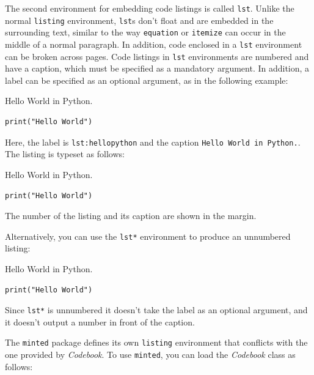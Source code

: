 \documentclass[minted]{codebook}
\begin{document}
The second environment for embedding code listings is called \verb|lst|.
Unlike the normal \verb|listing| environment, \verb|lst|s don't float and are embedded in the surrounding text, similar to the way \verb|equation| or \verb|itemize| can occur in the middle of a normal paragraph.
In addition, code enclosed in a \verb|lst| environment can be broken across pages.
Code listings in \verb|lst| environments are numbered and have a caption, which must be specified as a mandatory argument.
In addition, a label can be specified as an optional argument, as in the following example:
\begin{texcode}
\begin{lst}{Hello World in Python.}
\begin{Verbatim}
print("Hello World")
\end{Verbatim}
\end{lst}
\end{texcode}
Here, the label is \verb|lst:hellopython| and the caption \verb|Hello World in Python.|.
The listing is typeset as follows:
\begin{lst}{Hello World in Python.}
\begin{Verbatim}
print("Hello World")
\end{Verbatim}
\end{lst}
The number of the listing and its caption are shown in the margin.

Alternatively, you can use the \verb|lst*| environment to produce an unnumbered listing:
\begin{texcode}
\begin{lst*}{Hello World in Python.}
\begin{Verbatim}
print("Hello World")
\end{Verbatim}
\end{lst*}
\end{texcode}
Since \verb|lst*| is unnumbered it doesn't take the label as an optional argument, and it doesn't output a number in front of the caption.




\begin{note}
The \texttt{minted} package defines its own \verb|listing| environment that conflicts with the one provided by \emph{Codebook}.
To use \texttt{minted}, you can load the \emph{Codebook} class as follows:
\end{note}
\end{document}
